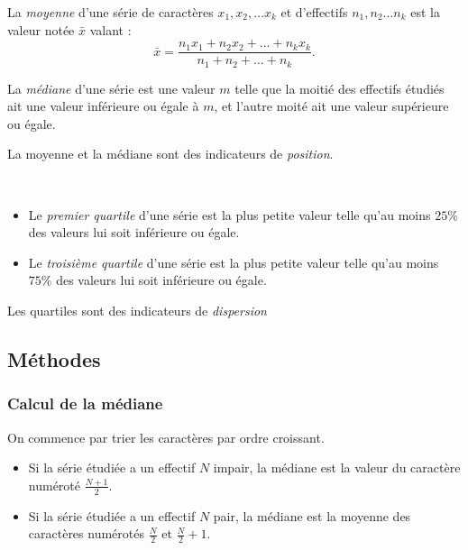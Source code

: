 \begin{definition}[Moyenne]
  La \emph{moyenne} d'une série de caractères $x_1, x_2, \ldots x_k$ et d'effectifs $n_1, n_2 \ldots n_k$ est la valeur notée $\bar x$ valant :
  \[{\bar x}=\dfrac{n_1x_1+n_2x_2+\ldots+n_kx_k}{n_1+n_2+\ldots+n_k}.\]
\end{definition}

\begin{definition}[Médiane]
  La \emph{médiane} d'une série est une valeur $m$ telle que la moitié des effectifs étudiés ait une valeur inférieure ou égale à $m$, et l'autre moité ait une valeur supérieure ou égale.
\end{definition}

\begin{remarque}
  La moyenne et la médiane sont des indicateurs de \emph{position}.
\end{remarque}

\begin{definition}[Quartiles]~
  \begin{itemize}
    \item Le \emph{premier quartile} d'une série est la plus petite valeur telle qu'au moins $25\%$ des valeurs lui soit inférieure ou égale.
    \item Le \emph{troisième quartile} d'une série est la plus petite valeur telle qu'au moins $75\%$ des valeurs lui soit inférieure ou égale.
  \end{itemize}
\end{definition}

\begin{remarque}
  Les quartiles sont des indicateurs de \emph{dispersion}
\end{remarque}

\subsection{Méthodes}
\subsubsection{Calcul de la médiane}
On commence par trier les caractères par ordre croissant.
\begin{itemize}
  \item Si la série étudiée a un effectif $N$ impair, la médiane est la valeur du caractère numéroté $\frac{N+1}{2}$.
  \item Si la série étudiée a un effectif $N$ pair, la médiane est la moyenne des caractères numérotés $\frac{N}{2}$ et $\frac{N}{2}+1$.
\end{itemize}

